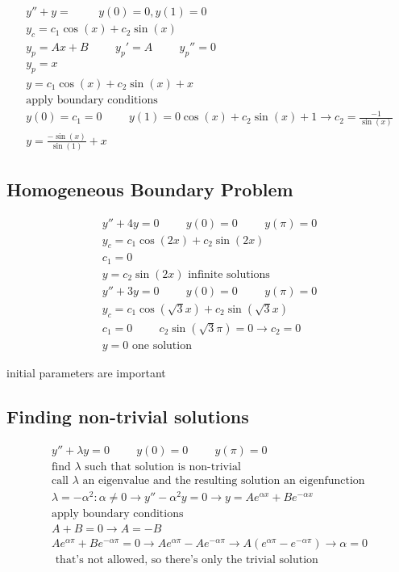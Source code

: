 \documentclass[fleqn]{report}
\newcommand{\hp}{\hspace{1cm}}
\newcommand{\equations} [1] {
\begin{gather*}
#1
\end{gather*}
}
\begin{document}
\equations{
y'' + y = 
\hp 
y(0) = 0, y(1) = 0
\\
y_c = c_1 \cos (x) + c_2 \sin (x)
\\
y_p = Ax + B \hp y_p' = A \hp y_p'' = 0
\\
y_p = x
\\
y = c_1 \cos (x) + c_2 \sin (x) + x
\\
\textrm{apply boundary conditions}
\\
y(0) = c_1 = 0
\hp
y(1) = 0 \cos (x) + c_2 \sin (x) + 1 \rightarrow c_2 = \frac{-1}{\sin(x)}
\\
y = \frac{- \sin (x)}{\sin (1)} + x
}

\subsection{Homogeneous Boundary Problem}
\equations{
y'' + 4y = 0
\hp
y(0) = 0
\hp
y(\pi) = 0
\\
y_c = c_1 \cos (2x) + c_2 \sin (2x)
\\
c_1 = 0
\\
y = c_2 \sin (2x)
\textrm{ infinite solutions}
\\
y'' + 3y = 0
\hp
y(0) = 0
\hp
y(\pi) = 0
\\
y_c = c_1 \cos (\sqrt{3}x) + c_2 \sin (\sqrt{3}x)
\\
c_1 = 0
\hp
c_2 \sin (\sqrt{3} \pi)= 0 \rightarrow c_2 = 0
\\
y = 0
\textrm{ one solution}
}
initial parameters are important

\subsection{Finding non-trivial solutions}
\equations{
y'' + \lambda y = 0
\hp
y(0) = 0
\hp
y(\pi) = 0
\\
\textrm{find $\lambda$ such that solution is non-trivial}
\\
\textrm{call $\lambda$ an eigenvalue and the resulting solution an eigenfunction}
\\
\lambda = - \alpha^2: \alpha \neq 0
\rightarrow
y'' - \alpha^2 y = 0
\rightarrow
y = Ae^{\alpha x} + Be^{-\alpha x}
\\
\textrm{apply boundary conditions}
\\
A + B = 0 \rightarrow A = -B
\\
Ae^{\alpha \pi} + Be^{-\alpha \pi} = 0
\rightarrow Ae^{\alpha \pi} - Ae^{-\alpha \pi} 
\rightarrow 
A (e^{\alpha \pi} - e^{-\alpha \pi} )
\rightarrow 
\alpha = 0
\\ 
\textrm{ that's not allowed, so there's only the trivial solution}
}
\end{document}
